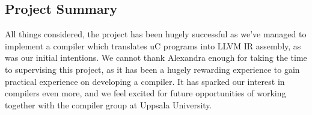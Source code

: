 
\subsection{Project Summary}
\label{sec:project_summary}

All things considered, the project has been hugely successful as we've managed to implement a compiler which translates uC programs into LLVM IR assembly, as was our initial intentions. We cannot thank Alexandra enough for taking the time to supervising this project, as it has been a hugely rewarding experience to gain practical experience on developing a compiler. It has sparked our interest in compilers even more, and we feel excited for future opportunities of working together with the compiler group at Uppsala University.
